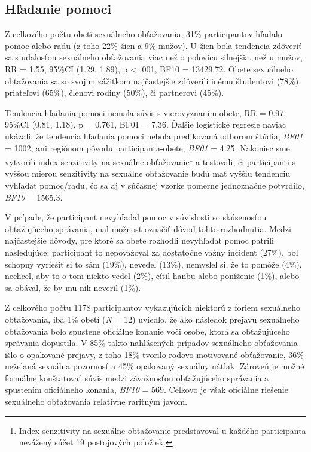 \documentclass[
]{article}
\begin{document}
\hypertarget{hux13eadanie-pomoci}{%
\subsection{Hľadanie pomoci}\label{hux13eadanie-pomoci}}

Z celkového počtu obetí sexuálneho obťažovania, 31\% participantov hľadalo pomoc alebo radu (z toho 22\% žien a 9\% mužov). U žien bola tendencia zdôveriť sa s udalosťou sexuálneho obťažovania viac než o polovicu silnejšia, než u mužov, RR = 1.55, 95\%CI (1.29, 1.89), p \textless{} .001, BF10 = 13429.72. Obete sexuálneho obťažovania sa so svojim zážitkom najčastejšie zdôverili inému študentovi (78\%), priateľovi (65\%), členovi rodiny (50\%), či partnerovi (45\%).

Tendencia hľadania pomoci nemala súvis s vierovyznaním obete, RR = 0.97, 95\%CI (0.81, 1.18), p = 0.761, BF01 = 7.36. Ďalšie logistické regresie naviac ukázali, že tendencia hľadania pomoci nebola predikovaná odborom štúdia, \emph{BF01} = 1002, ani regiónom pôvodu participanta-obete, \emph{BF01} = 4.25. Nakoniec sme vytvorili index senzitivity na sexuálne obťažovanie\footnote{Index senzitivity na sexuálne obťažovanie predstavoval u každého participanta nevážený súčet 19 postojových položiek.} a testovali, či participanti s vyššou mierou senzitivity na sexuálne obťažovanie budú mať vyššiu tendenciu vyhľadať pomoc/radu, čo sa aj v súčasnej vzorke pomerne jednoznačne potvrdilo, \emph{BF10} = 1565.3.

V prípade, že participant nevyhľadal pomoc v súvislosti so skúsenosťou obťažujúceho správania, mal možnosť označiť dôvod tohto rozhodnutia. Medzi najčastejšie dôvody, pre ktoré sa obete rozhodli nevyhľadať pomoc patrili nasledujúce: participant to nepovažoval za dostatočne vážny incident (27\%), bol schopný vyriešiť si to sám (19\%), nevedel (13\%), nemyslel si, že to pomôže (4\%), nechcel, aby to o tom niekto vedel (2\%), cítil hanbu alebo poníženie (1\%), alebo sa obával, že by mu nik neveril (1\%).

Z celkového počtu 1178 participantov vykazujúcich niektorú z foriem sexuálneho obťažovania, iba 1\% obetí (\emph{N} = 12) uviedlo, že ako následok prejavu sexuálneho obťažovania bolo spustené oficiálne konanie voči osobe, ktorá sa obťažujúceho správania dopustila. V 85\% takto nahlásených prípadov sexuálneho obťažovania išlo o opakované prejavy, z toho 18\% tvorilo rodovo motivované obťažovanie, 36\% neželaná sexuálna pozornosť a 45\% opakovaný sexuálny nátlak. Zároveň je možné formálne konštatovať súvis medzi závažnosťou obťažujúceho správania a spustením oficiálneho konania, \emph{BF10} = 569. Celkovo je však oficiálne riešenie sexuálneho obťažovania relatívne raritným javom.
\end{document}
